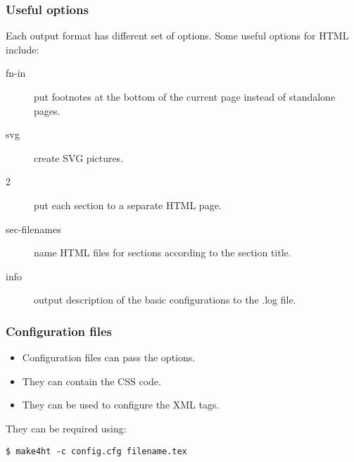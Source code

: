 \documentclass{beamer}
\begin{document}
\begin{frame}
  \frametitle{Useful options}
Each output format has different set of options. Some useful options for HTML include:

\begin{description}
  \item[fn-in] put footnotes at the bottom of the current page instead of standalone pages.
  \item[svg] create SVG pictures.
  \item[2] put each section to a separate HTML page.
  \item[sec-filenames] name HTML files for sections according to the section title.
  \item[info] output description of the basic configurations to the .log file.
\end{description}

\end{frame}

\begin{frame}[fragile]
  \frametitle{Configuration files}
  \begin{itemize}
    \item Configuration files can pass the options.
    \item They can contain the CSS code.
    \item They can be used to configure the XML tags.
  \end{itemize}
  They can be required using:
\begin{verbatim}
$ make4ht -c config.cfg filename.tex
\end{verbatim}
\end{frame}
\end{document}
